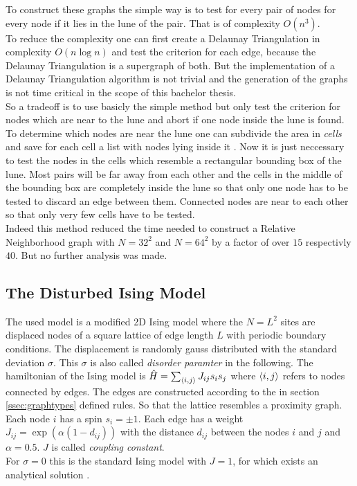     To construct these graphs the simple way is to test for every
    pair of nodes for every node if it lies in the lune of the pair.
    That is of complexity \(O (n^3)\).\\
    To reduce the complexity one can first create a Delaunay
    Triangulation in complexity \(O (n \log n)\)
    \cite{Leach1992} and test the criterion for each edge, because
    the Delaunay Triangulation is a supergraph of both. But the
    implementation of a Delaunay Triangulation algorithm is not
    trivial and the generation of the graphs is not time critical in
    the scope of this bachelor thesis.\\
    So a tradeoff is to use basicly the simple method but only test
    the criterion for nodes which are near to the lune and abort if
    one node inside the lune is found. To determine which nodes are
    near the lune one can subdivide the area in \emph{cells} and save
    for each cell a list with nodes lying inside it \cite{RNGCell}.
    Now it is just neccessary to test the nodes in the cells which
    resemble a rectangular bounding box of the lune. Most pairs will be
    far away from each other and the cells in the middle of the bounding
    box are completely inside the lune so that only one node has to be
    tested to discard an edge between them. Connected nodes are near to
    each other so that only very few cells have to be tested.\\
    Indeed this method reduced the time needed to construct a Relative
    Neighborhood graph with \(N=32^2\) and \(N=64^2\) by a factor of
    over \(15\) respectivly \(40\). But no further analysis was made.

\subsection{The Disturbed Ising Model}
\label{ssec:isingmodel}
    The used model is a modified 2D Ising model where the \(N=L^2\) sites
    are displaced nodes of a square lattice of edge length \(L\) with
    periodic boundary conditions. The displacement is randomly gauss
    distributed with the standard deviation \(\sigma\). This \(\sigma\)
    is also called \emph{disorder paramter} in the following.
    The hamiltonian of the Ising model is
    \(\hat{H} = \sum_{\left< i,j \right>}J_{ij}s_{i}s_{j}\)
    where \(\left< i,j \right>\) refers to nodes connected  by edges.
    The edges are constructed according to the in section
    \ref{ssec:graphtypes} defined rules. So that the lattice resembles a
    proximity graph. Each node \(i\) has a spin \(s_i = \pm 1\). Each
    edge has a weight \(J_{ij} = \exp (\alpha (1-d_{ij}))\) with the
    distance \(d_{ij}\) between the nodes \(i\) and \(j\) and
    \(\alpha = 0.5\). \(J\) is called \emph{coupling constant}.\\
    For \(\sigma = 0\) this is the standard Ising model with \(J = 1\),
    for which exists an analytical solution \cite{Onsager1944}.\\

